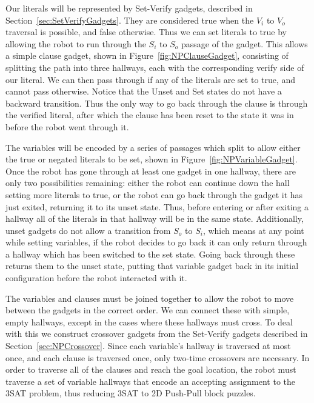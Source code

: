 Our literals will be represented by Set-Verify gadgets, described in Section~\ref{sec:SetVerifyGadgets}. They are considered true when the $V_i$ to $V_o$ traversal is possible, and false otherwise. Thus we can set literals to true by allowing the robot to run through the $S_i$ to $S_o$ passage of the gadget. This allows a simple clause gadget, shown in Figure~\ref{fig:NPClauseGadget}, consisting of splitting the path into three hallways, each with the corresponding verify side of our literal. We can then pass through if any of the literals are set to true, and cannot pass otherwise. Notice that the Unset and Set states do not have a backward transition. Thus the only way to go back through the clause is through the verified literal, after which the clause has been reset to the state it was in before the robot went through it.

The variables will be encoded by a series of passages which split to allow either the true or negated literals to be set, shown in Figure~\ref{fig:NPVariableGadget}. Once the robot has gone through at least one gadget in one hallway, there are only two possibilities remaining: either the robot can continue down the hall setting more literals to true, or the robot can go back through the gadget it has just exited, returning it to its unset state. Thus, before entering or after exiting a hallway all of the literals in that hallway will be in the same state. Additionally, unset gadgets do not allow a transition from $S_o$ to $S_i$, which means at any point while setting variables, if the robot decides to go back it can only return through a hallway which has been switched to the set state. Going back through these returns them to the unset state, putting that variable gadget back in its initial configuration before the robot interacted with it.

The variables and clauses must be joined together to allow the robot to move between the gadgets in the correct order. We can connect these with simple, empty hallways, except in the cases where these hallways must cross. To deal with this we construct crossover gadgets from the Set-Verify gadgets described in Section~\ref{sec:NPCrossover}. Since each variable's hallway is traversed at most once, and each clause is traversed once, only two-time crossovers are necessary. In order to traverse all of the clauses and reach the goal location, the robot must traverse a set of variable hallways that encode an accepting assignment to the 3SAT problem, thus reducing 3SAT to 2D Push-Pull block puzzles.


